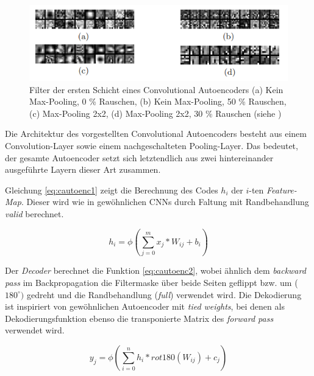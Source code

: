 \begin{figure}
\centering
\includegraphics[width=0.7\linewidth]{images/4_mascii}
\caption[]{Filter der ersten Schicht eines Convolutional Autoencoders (a) Kein Max-Pooling, 0 \% Rauschen, (b) Kein Max-Pooling, 50 \% Rauschen, (c) Max-Pooling 2x2, (d) Max-Pooling 2x2, 30 \% Rauschen (siehe \cite{Masci2011})}
\label{fig:4_mascii}
\end{figure}

Die Architektur des vorgestellten Convolutional Autoencoders besteht aus einem Convolution-Layer sowie einem nachgeschalteten Pooling-Layer. Das bedeutet, der gesamte Autoencoder setzt sich letztendlich aus zwei hintereinander ausgeführte Layern dieser Art zusammen.

Gleichung \ref{eq:cautoenc1} zeigt die Berechnung des Codes $h_i$ der $i$-ten \textit{Feature-Map}. Dieser wird wie in gewöhnlichen CNNs durch Faltung mit Randbehandlung \textit{valid} berechnet. 

\begin{equation}
\label{eq:cautoenc1} 
h_i = \phi(\sum_{j=0}^{m}  x_{j} \ast W_{ij} + b_i)
\end{equation}

Der \textit{Decoder} berechnet die Funktion \ref{eq:cautoenc2}, wobei ähnlich dem \textit{backward pass} im Backpropagation die Filtermaske über beide Seiten geflippt bzw. um ($180^\circ)$ gedreht und die Randbehandlung (\textit{full}) verwendet wird. Die Dekodierung ist inspiriert von gewöhnlichen Autoencoder mit \textit{tied weights}, bei denen als Dekodierungsfunktion ebenso die transponierte Matrix des \textit{forward pass} verwendet wird.

\begin{equation}
\label{eq:cautoenc2} 
y_j = \phi(\sum_{i=0}^{n} h_{i} \ast rot180(W_{ij}) + c_j)
\end{equation}


